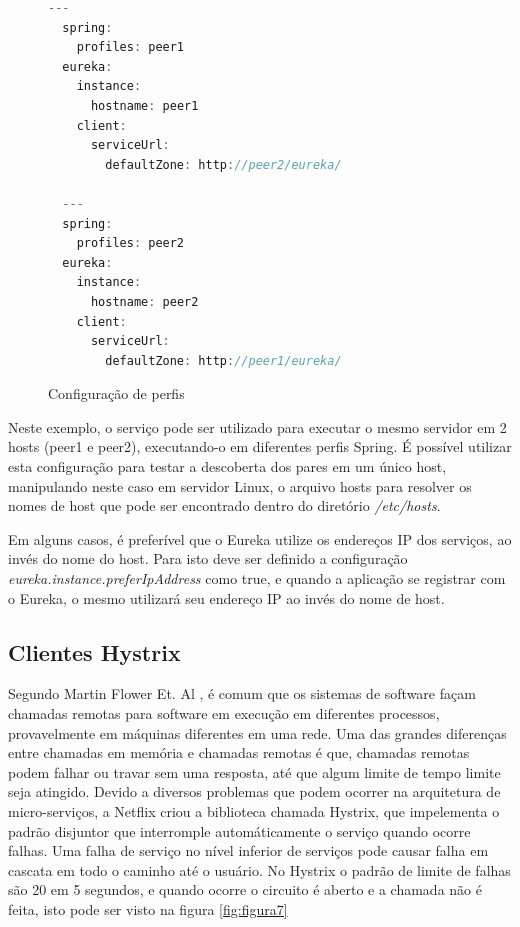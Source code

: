 \documentclass[journal]{IEEEtran}
\begin{document}
\begin{figure}[h]
\centering

\begin{lstlisting}[language=Java]
  ---
  spring:
    profiles: peer1
  eureka:
    instance:
      hostname: peer1
    client:
      serviceUrl:
        defaultZone: http://peer2/eureka/

  ---
  spring:
    profiles: peer2
  eureka:
    instance:
      hostname: peer2
    client:
      serviceUrl:
        defaultZone: http://peer1/eureka/
\end{lstlisting}

\caption{Configuração de perfis}
\label{alg:figuranove}
\end{figure}

Neste exemplo, o serviço pode ser utilizado para executar o mesmo servidor em 2 hosts (peer1 e peer2), executando-o em diferentes perfis Spring. É possível utilizar esta configuração para testar a descoberta dos pares em um único host, manipulando neste caso em servidor Linux, o arquivo hosts para resolver os nomes de host que pode ser encontrado dentro do diretório \emph{/etc/hosts}.

Em alguns casos, é preferível que o Eureka utilize os endereços IP dos serviços, ao invés do nome do host. Para isto deve ser definido a configuração \emph{eureka.instance.preferIpAddress} como true, e quando a aplicação se registrar com o Eureka, o mesmo utilizará seu endereço IP ao invés do nome de host.

\subsection{Clientes Hystrix}

Segundo Martin Flower Et. Al \cite{martinfowleretal}, é comum que os sistemas de software façam chamadas remotas para software em execução em diferentes processos, provavelmente em máquinas diferentes em uma rede. Uma das grandes diferenças entre chamadas em memória e chamadas remotas é que, chamadas remotas podem falhar ou travar sem uma resposta, até que algum limite de tempo limite seja atingido. Devido a diversos problemas que podem ocorrer na arquitetura de micro-serviços, a Netflix criou a biblioteca chamada Hystrix, que impelementa o padrão disjuntor que interromple automáticamente o serviço quando ocorre falhas. Uma falha de serviço no nível inferior de serviços pode causar falha em cascata em todo o caminho até o usuário. No Hystrix o padrão de limite de falhas são 20 em 5 segundos, e quando ocorre o circuito é aberto e a chamada não é feita, isto pode ser visto na figura \ref{fig:figura7}
\end{document}
